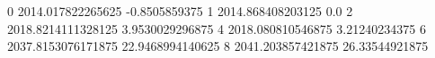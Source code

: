 0 2014.017822265625 -0.8505859375
1 2014.868408203125 0.0
2 2018.8214111328125 3.9530029296875
4 2018.080810546875 3.21240234375
6 2037.8153076171875 22.9468994140625
8 2041.203857421875 26.33544921875
